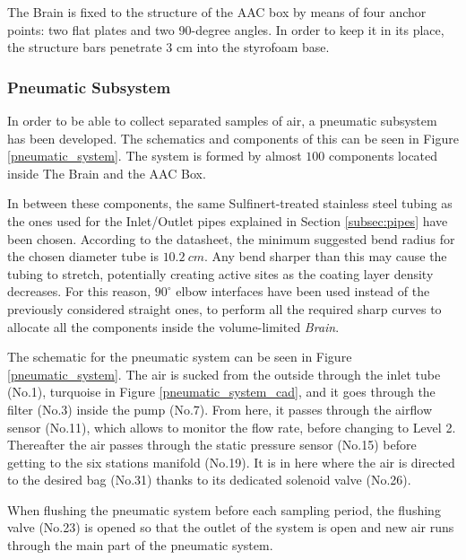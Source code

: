 \smallskip
The Brain is fixed to the structure of the AAC box by means of four anchor points: two flat plates and two 90-degree angles. In order to keep it in its place, the structure bars penetrate 3 cm into the styrofoam base.


\subsubsection{Pneumatic Subsystem}
\label{sec:4.4.5}

In order to be able to collect separated samples of air, a pneumatic subsystem has been developed. The schematics and components of this can be seen in Figure \ref{pneumatic_system}. The system is formed by almost $100$ components located inside The Brain and the AAC Box. 

In between these components, the same Sulfinert-treated stainless steel tubing as the ones used for the Inlet/Outlet pipes explained in Section \ref{subsec:pipes} have been chosen. According to the datasheet, the minimum suggested bend radius for the chosen diameter tube is $10.2\ cm$. Any bend sharper than this may cause the tubing to stretch, potentially creating active sites as the coating layer density decreases. For this reason, $90^\circ$ elbow interfaces have been used instead of the previously considered straight ones,  to perform all the required sharp curves to allocate all the components inside the volume-limited \emph{Brain}.

The schematic for the pneumatic system can be seen in Figure \ref{pneumatic_system}. The air is sucked from the outside through the inlet tube (No.1), turquoise in Figure \ref{pneumatic_system_cad}, and it goes through the filter (No.3) inside the pump (No.7). From here, it passes through the airflow sensor (No.11), which allows to monitor the flow rate, before changing to Level 2. Thereafter the air passes through the static pressure sensor (No.15) before getting to the six stations manifold (No.19). It is in here where the air is directed to the desired bag (No.31) thanks to its dedicated solenoid valve (No.26).

When flushing the pneumatic system before each sampling period, the flushing valve (No.23) is opened so that the outlet of the system is open and new air runs through the main part of the pneumatic system. 

